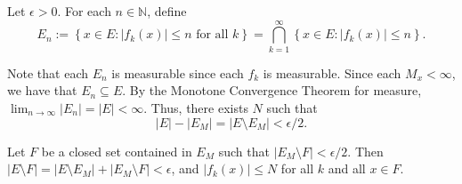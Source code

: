 \documentclass[UTF8,a4paper,10pt]{article}
\begin{document}
  Let $\epsilon > 0$. For each $n \in \mathbb{N}$, define
  \[ E_n := \left\{x \in E : |f_k(x)| \leq n \text{ for all } k\right\} = \bigcap_{k=1}^{\infty} \left\{x \in E : |f_k(x)| \leq n\right\}.\]
  
  Note that each $E_n$ is measurable since each $f_k$ is measurable.
  Since each $M_x < \infty$, we have that $E_n \subseteq E$. By the Monotone Convergence Theorem for measure, $\lim_{n \to \infty} |E_n| = |E| < \infty$. Thus, there exists $N$ such that
  \[ |E| - |E_M| = |E \setminus E_M| < \epsilon/2.\]
  
  Let $F$ be a closed set contained in $E_M$ such that $|E_M \setminus F| < \epsilon/2$.
  Then $|E \setminus F| = |E \setminus E_M| + |E_M \setminus F| < \epsilon$, and $|f_k(x)| \leq N$ for all $k$ and all $x \in F$.
  
\end{document}
